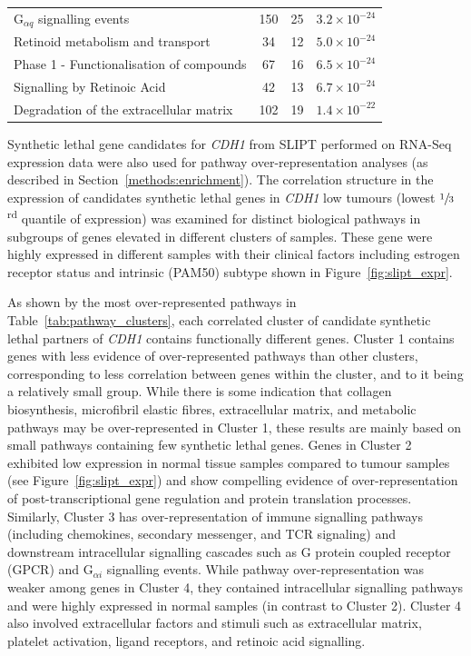 \begin{table}[!hp]
{\begin{tabular}{lccc}
  \rowcolor{Cluster_Red!15} 
  G$_{\alpha q}$ signalling events & 150 &  25 & $3.2 \times 10^{-24}$ \\
  \rowcolor{Cluster_Red!20} 
  Retinoid metabolism and transport &  34 &  12 & $5.0 \times 10^{-24}$ \\
  \rowcolor{Cluster_Red!15} 
  Phase 1 - Functionalisation of compounds &  67 &  16 & $6.5 \times 10^{-24}$ \\
  \rowcolor{Cluster_Red!20} 
  Signalling by Retinoic Acid &  42 &  13 & $6.7 \times 10^{-24}$ \\
  \rowcolor{Cluster_Red!15} 
  Degradation of the extracellular matrix & 102 &  19 & $1.4 \times 10^{-22}$ \\ 
  \hline
\end{tabular}
}
\end{table}

Synthetic lethal gene candidates for \textit{CDH1} from \gls{SLIPT} performed on RNA-Seq expression data were also used for pathway over-representation analyses (as described in Section~\ref{methods:enrichment}). The correlation structure in the expression of candidates synthetic lethal genes in \textit{CDH1} low tumours (lowest $\sfrac{1}{3}$\textsuperscript{rd} quantile of expression) was examined for distinct biological pathways in subgroups of genes elevated in different clusters of samples. These gene were highly expressed in different samples with their clinical factors including estrogen receptor status and intrinsic (PAM50) subtype \citep{Parker2009} shown in Figure~\ref{fig:slipt_expr}.

As shown by the most over-represented pathways in Table~\ref{tab:pathway_clusters}, each correlated cluster of candidate synthetic lethal partners of \textit{CDH1} contains functionally different genes. %
Cluster 1 contains genes with less evidence of over-represented pathways than other clusters, corresponding to less correlation between genes within the cluster, and to it being a relatively small group. While there is some indication that collagen biosynthesis, microfibril elastic fibres, extracellular matrix, and metabolic pathways may be over-represent\-ed in Cluster 1, these results are mainly based on small pathways containing few synthetic lethal genes. Genes in Cluster 2 exhibited low expression in normal tissue samples compared to tumour samples (see Figure~\ref{fig:slipt_expr}) and show compelling evidence of over-represent\-ation of post-transcriptional gene regulation and protein translation processes. Similarly, Cluster 3 has over-represent\-ation of immune signalling pathways (including chemokines, secondary messenger, and TCR signaling) and downstream intracellular signalling cascades such as G protein coupled receptor (GPCR) and  G$_{\alpha i}$ signalling events. While pathway over-represent\-ation was weaker among genes in Cluster 4, they contained intracellular signalling pathways and were highly expressed in normal samples (in contrast to Cluster 2). Cluster 4 also involved extracellular factors and stimuli such as extracellular matrix, platelet activation, ligand receptors, and retinoic acid signalling.

